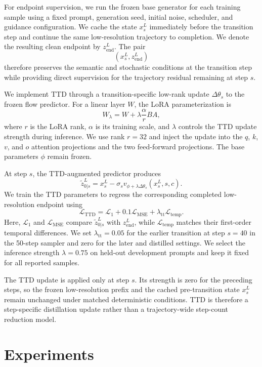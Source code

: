 \documentclass[letterpaper]{article} %
\begin{document}
For endpoint supervision, we run the frozen base generator for each training
sample using a fixed prompt, generation seed, initial noise, scheduler, and
guidance configuration. We cache the state \(x_s^{L}\) immediately before the
transition step and continue the same low-resolution
trajectory to completion. We denote the resulting clean endpoint by
\(z_{\mathrm{end}}^{L}\). The pair
\[
\left(x_s^{L},z_{\mathrm{end}}^{L}\right)
\]
therefore preserves the semantic and stochastic conditions at the
transition step while providing direct supervision for the trajectory
residual remaining at step \(s\).

We implement TTD through a transition-specific low-rank update
\(\Delta\theta_s\) to the frozen flow predictor. For a linear layer \(W\), the
LoRA parameterization is
\[
W_{\lambda}
=
W
+
\lambda\frac{\alpha}{r}BA,
\]
where \(r\) is the LoRA rank, \(\alpha\) is its training scale, and
\(\lambda\) controls the TTD update strength during inference. We use rank
\(r=32\) and inject the update into the \(q\), \(k\), \(v\), and \(o\)
attention projections and the two feed-forward projections. The base
parameters \(\phi\) remain frozen.

At step \(s\), the TTD-augmented predictor produces
\[
\widetilde{z}_{0|s}^{L}
=
x_s^{L}
-
\sigma_s
v_{\phi+\lambda\Delta\theta_s}
(x_s^{L},s,c).
\]
We train the TTD parameters to regress the corresponding completed
low-resolution endpoint using
\[
\mathcal{L}_{\mathrm{TTD}}
=
\mathcal{L}_{1}
+
0.1\mathcal{L}_{\mathrm{MSE}}
+
\lambda_{\mathrm{tt}}\mathcal{L}_{\mathrm{temp}}.
\]
Here, \(\mathcal{L}_{1}\) and \(\mathcal{L}_{\mathrm{MSE}}\) compare
\(\widetilde{z}_{0|s}^{L}\) with \(z_{\mathrm{end}}^{L}\), while
\(\mathcal{L}_{\mathrm{temp}}\) matches their first-order temporal
differences. We set \(\lambda_{\mathrm{tt}}=0.05\) for the earlier
transition at step \(s=40\) in the 50-step sampler and zero for
the later and distilled settings. We select the inference strength
\(\lambda=0.75\) on held-out
development prompts and keep it fixed for all reported samples.

The TTD update is applied only at step \(s\). Its strength is zero for the
preceding steps, so the frozen low-resolution prefix and the cached
pre-transition state \(x_s^{L}\) remain unchanged under matched
deterministic conditions. TTD is therefore a step-specific distillation update
rather than a trajectory-wide step-count reduction model.

\section{Experiments}
\label{sec:experiments}
\end{document}
